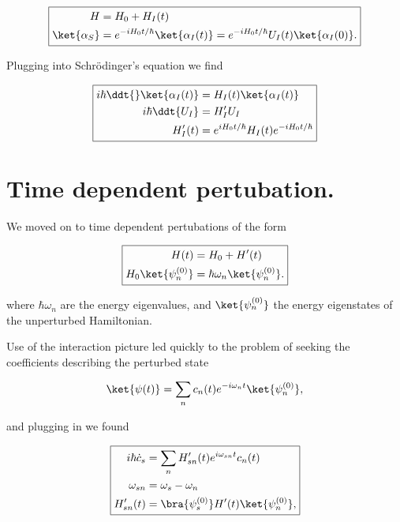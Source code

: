\begin{equation}\label{eqn:qmTwoReview:n}
\boxed{
\begin{aligned}
H &= H_0 + H_I(t) \\
\ket{\alpha_S} &= e^{-i H_0 t/\hbar } \ket{\alpha_I(t)} = e^{-i H_0 t/\hbar } U_I(t) \ket{\alpha_I(0)} .
\end{aligned}
}
\end{equation}

Plugging into Schr\"{o}dinger's equation we find

\begin{equation}\label{eqn:qmTwoReview:n}
\boxed{
\begin{aligned}
i \hbar \ddt{} \ket{\alpha_I(t)} &= H_I(t) \ket{\alpha_I(t)} \\
i \hbar \ddt{U_I} &= H_I' U_I \\
H_I'(t) &= e^{i H_0 t/\hbar } H_I(t) e^{-i H_0 t/\hbar } 
\end{aligned}
}
\end{equation}

\section{Time dependent pertubation.}

We moved on to time dependent pertubations of the form

\begin{equation}\label{eqn:qmTwoReview:n}
\boxed{
\begin{aligned}
H(t) &= H_0 + H'(t) \\
H_0 \ket{\psi_n^{(0)} } &= \hbar \omega_n \ket{\psi_n^{(0)} }.
\end{aligned}
}
\end{equation}

where $\hbar \omega_n$ are the energy eigenvalues, and $\ket{\psi_n^{(0)} }$ the energy eigenstates of the unperturbed Hamiltonian.

Use of the interaction picture led quickly to the problem of seeking the coefficients describing the perturbed state

\begin{equation}\label{eqn:qmTwoReview:n}
\ket{\psi(t)} = \sum_n c_n(t) e^{-i \omega_n t} \ket{\psi_n^{(0)} },
\end{equation}

and plugging in we found

\begin{equation}\label{eqn:qmTwoReview:n}
\boxed{
\begin{aligned}
i \hbar \dot{c}_s &= \sum_n H_{sn}'(t) e^{i \omega_{sn} t} c_n(t) \\
\omega_{sn} &= \omega_s - \omega_n \\
H_{sn}'(t) &= \bra{\psi_s^{(0)}} H'(t) \ket{\psi_n^{(0)} },
\end{aligned}
}
\end{equation}


